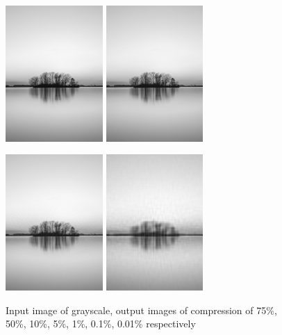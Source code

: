 \documentclass{article}
\begin{document}
{\begin{figure}[htp]
\begin{overprint}
            \includegraphics[width=0.33\textwidth]{Assignment-14/fig-4.jpg}
            \includegraphics[width=0.33\textwidth]{Assignment-14/fig-5.jpg}
        \end{overprint}
        \begin{overprint}
            \includegraphics[width=0.33\textwidth]{Assignment-14/fig-6.jpg}
            \includegraphics[width=0.33\textwidth]{Assignment-14/fig-7.jpg}
        \end{overprint}
        \caption{Input image of grayscale, output images of compression of 75\%, 50\%, 10\%, 5\%, 1\%, 0.1\%, 0.01\% respectively}
    \end{figure}
}
\clearpage
\end{document}
